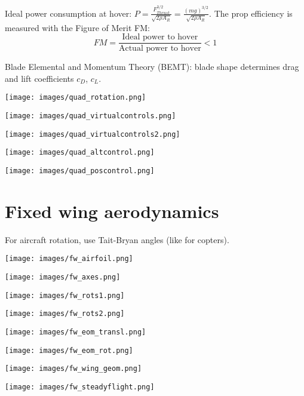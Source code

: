 \documentclass[a4paper, 8pt]{extarticle}
\begin{document}
\begin{multicols*}{3}
Ideal power consumption at hover: $P = \frac{F_{Thrust}^{3/2}}{\sqrt{2\rho A_R}} = \frac{(mg)^{3/2}}{\sqrt{2\rho A_R}}$. The prop efficiency is measured with the Figure of Merit FM:
$$FM = \frac{\text{Ideal power to hover}}{\text{Actual power to hover}} < 1$$

Blade Elemental and Momentum Theory (BEMT): blade shape determines drag and lift coefficients $c_D$, $c_L$.

\texttt{[image: images/quad\_rotation.png]}

\texttt{[image: images/quad\_virtualcontrols.png]}

\texttt{[image: images/quad\_virtualcontrols2.png]}

\texttt{[image: images/quad\_altcontrol.png]}

\texttt{[image: images/quad\_poscontrol.png]}



\section{Fixed wing aerodynamics}
For aircraft rotation, use Tait-Bryan angles (like for copters).


\texttt{[image: images/fw\_airfoil.png]}

\texttt{[image: images/fw\_axes.png]}

\texttt{[image: images/fw\_rots1.png]}

\texttt{[image: images/fw\_rots2.png]}

\texttt{[image: images/fw\_eom\_transl.png]}

\texttt{[image: images/fw\_eom\_rot.png]}

\texttt{[image: images/fw\_wing\_geom.png]}

\texttt{[image: images/fw\_steadyflight.png]}


\end{multicols*}
\end{document}
